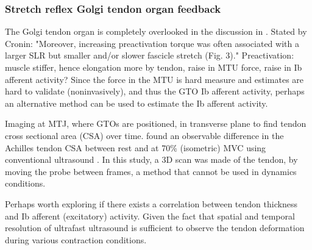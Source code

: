 


\subsubsection{Stretch reflex Golgi tendon organ feedback}
The Golgi tendon organ is completely overlooked in the discussion in \citet{cronin_triceps_2015}. 
Stated by Cronin: "Moreover, increasing preactivation torque was often associated with a larger SLR but smaller and/or slower fascicle stretch (Fig. 3)." Preactivation: muscle stiffer, hence elongation more by tendon, raise in MTU force, raise in Ib afferent activity? 
Since the force in the MTU is hard measure and estimates are hard to validate (noninvasively), and thus the GTO Ib afferent activity, perhaps an alternative method can be used to estimate the Ib afferent activity. %

Imaging at MTJ, where GTOs are positioned, in transverse plane to find tendon cross sectional area (CSA) over time.  \citeauthor{obst_three-dimensional_2014} found an observable difference in the Achilles tendon CSA between rest and at 70\% (isometric) MVC using conventional ultrasound \cite{obst_three-dimensional_2014}. In this study, a 3D scan was made of the tendon, by moving the probe between frames, a method that cannot be used in dynamics conditions. 

Perhaps worth exploring if there exists a correlation between tendon thickness and Ib afferent (excitatory) activity. Given the fact that spatial and temporal resolution of ultrafast ultrasound is sufficient to observe the tendon deformation during various contraction conditions. 

